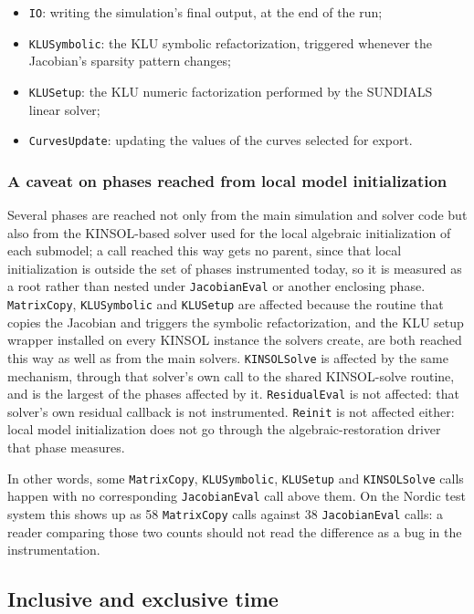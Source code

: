 \documentclass[a4paper, 12pt]{report}
\begin{document}
\begin{itemize}
  \item \texttt{IO}: writing the simulation's final output, at the end of the run;
  \item \texttt{KLUSymbolic}: the KLU symbolic refactorization, triggered whenever the Jacobian's sparsity pattern changes;
  \item \texttt{KLUSetup}: the KLU numeric factorization performed by the SUNDIALS linear solver;
  \item \texttt{CurvesUpdate}: updating the values of the curves selected for export.
\end{itemize}

\subsubsection{A caveat on phases reached from local model initialization}

Several phases are reached not only from the main simulation and solver code but also from the KINSOL-based solver used for the local algebraic initialization of each submodel; a call reached this way gets no parent, since that local initialization is outside the set of phases instrumented today, so it is measured as a root rather than nested under \texttt{JacobianEval} or another enclosing phase. \texttt{MatrixCopy}, \texttt{KLUSymbolic} and \texttt{KLUSetup} are affected because the routine that copies the Jacobian and triggers the symbolic refactorization, and the KLU setup wrapper installed on every KINSOL instance the solvers create, are both reached this way as well as from the main solvers. \texttt{KINSOLSolve} is affected by the same mechanism, through that solver's own call to the shared KINSOL-solve routine, and is the largest of the phases affected by it. \texttt{ResidualEval} is not affected: that solver's own residual callback is not instrumented. \texttt{Reinit} is not affected either: local model initialization does not go through the algebraic-restoration driver that phase measures.

In other words, some \texttt{MatrixCopy}, \texttt{KLUSymbolic}, \texttt{KLUSetup} and \texttt{KINSOLSolve} calls happen with no corresponding \texttt{JacobianEval} call above them. On the Nordic test system this shows up as 58 \texttt{MatrixCopy} calls against 38 \texttt{JacobianEval} calls: a reader comparing those two counts should not read the difference as a bug in the instrumentation.

\subsection{Inclusive and exclusive time}
\end{document}
